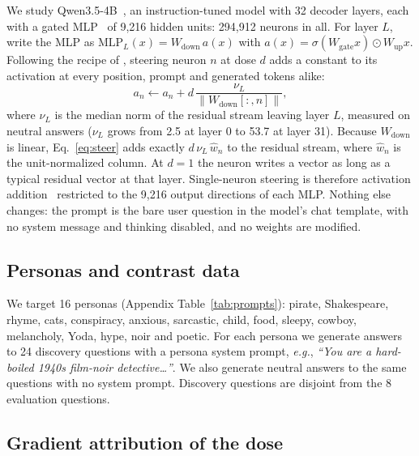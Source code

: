 \documentclass[11pt]{article}
\newcommand{\dose}{d}
\newcommand{\wdown}{W_{\text{down}}}
\begin{document}
We study Qwen3.5-4B~\citep{qwen35_4b}, an instruction-tuned model with 32 decoder layers, each with a gated MLP~\citep{shazeer2020glu} of 9,216 hidden units: 294,912 neurons in all. For layer $L$, write the MLP as $\mathrm{MLP}_L(x) = \wdown\, a(x)$ with $a(x) = \sigma(W_{\text{gate}}x)\odot W_{\text{up}}x$. Following the recipe of \citet{lyra2026steer}, steering neuron $n$ at dose $\dose$ adds a constant to its activation at every position, prompt and generated tokens alike:
\begin{equation}
a_n \leftarrow a_n + \dose\,\frac{\nu_L}{\lVert \wdown[:,n]\rVert}, \label{eq:steer}
\end{equation}
where $\nu_L$ is the median norm of the residual stream leaving layer $L$, measured on neutral answers ($\nu_L$ grows from 2.5 at layer 0 to 53.7 at layer 31). Because $\wdown$ is linear, Eq.~\eqref{eq:steer} adds exactly $\dose\,\nu_L\,\hat{w}_n$ to the residual stream, where $\hat w_n$ is the unit-normalized column. At $\dose=1$ the neuron writes a vector as long as a typical residual vector at that layer. Single-neuron steering is therefore activation addition~\citep{turner2023activation} restricted to the 9,216 output directions of each MLP. Nothing else changes: the prompt is the bare user question in the model's chat template, with no system message and thinking disabled, and no weights are modified.

\subsection{Personas and contrast data}

We target 16 personas (Appendix Table~\ref{tab:prompts}): pirate, Shakespeare, rhyme, cats, conspiracy, anxious, sarcastic, child, food, sleepy, cowboy, melancholy, Yoda, hype, noir and poetic. For each persona we generate answers to 24 discovery questions with a persona system prompt, \emph{e.g.}, \emph{``You are a hard-boiled 1940s film-noir detective\ldots''}. We also generate neutral answers to the same questions with no system prompt. Discovery questions are disjoint from the 8 evaluation questions.

\subsection{Gradient attribution of the dose}
\end{document}
